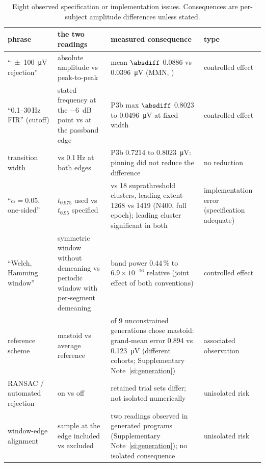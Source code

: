 \begin{table}[!htbp]
\centering\footnotesize
\caption{Eight observed specification or implementation issues. Consequences are per-subject amplitude differences unless stated.}
\label{tab:instances}
\begin{tabular}{>{\raggedright\arraybackslash}p{2.5cm}>{\raggedright\arraybackslash}p{4.0cm}>{\raggedright\arraybackslash}p{4.8cm}>{\raggedright\arraybackslash}p{2.5cm}}
\toprule
phrase & the two readings & measured consequence & type \\
\midrule
``\SI{\pm 100}{\uV} rejection'' & absolute amplitude vs peak-to-peak & mean \(\absdiff\) 0.0886 vs \SI{0.0396}{\uV} (MMN, \eeglab{}) & controlled effect \\
``0.1--30\,Hz FIR'' (cutoff) & stated frequency at the \SI{-6}{dB} point vs at the passband edge & P3b max \(\absdiff\) 0.8023 to \SI{0.0496}{\uV} at fixed width & controlled effect \\
transition width & 0.2 vs 0.1\,Hz at both edges & P3b 0.7214 to \SI{0.8023}{\uV}: pinning did not reduce the difference & no reduction \\
``\(\alpha = 0.05\), one-sided'' & \(t_{0.975}\) used vs \(t_{0.95}\) specified & 14 vs 18 suprathreshold clusters, leading extent 1268 vs 1419 (N400, full epoch); leading cluster significant in both & implementation error (specification adequate) \\
``Welch, Hamming window'' & symmetric window without demeaning vs periodic window with per-segment demeaning & band power 0.44\,\% to \(6.9\times10^{-16}\) relative (joint effect of both conventions) & controlled effect \\
reference scheme & mastoid vs average reference & 7 of 9 unconstrained generations chose mastoid: grand-mean error 0.894 vs \SI{0.123}{\uV} (different cohorts; Supplementary Note~\ref*{si:generation}) & associated observation \\
RANSAC / automated rejection & on vs off & retained trial sets differ; not isolated numerically & unisolated risk \\
window-edge alignment & sample at the edge included vs excluded & two readings observed in generated programs (Supplementary Note~\ref*{si:generation}); no isolated consequence & unisolated risk \\
\bottomrule
\end{tabular}
\end{table}
